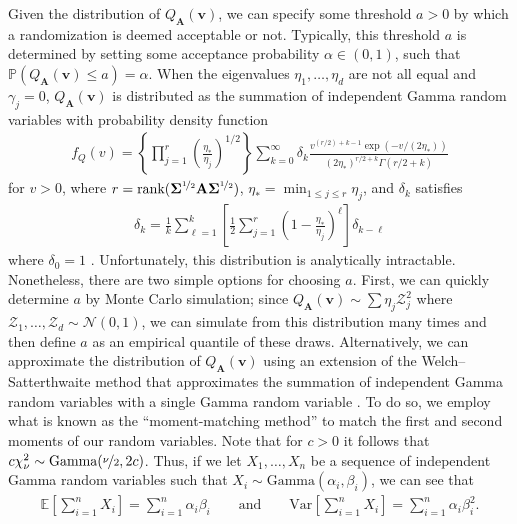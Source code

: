 \documentclass[11pt,twoside]{article}
\theoremstyle{definition}
\theoremstyle{remark}
\begin{document}
Given the distribution of $Q_{\mathbf{A}}(\mathbf{v})$, we can specify some threshold $a > 0$ by which a randomization is deemed acceptable or not. Typically, this threshold $a$ is determined by setting some acceptance probability $\alpha \in (0, 1)$, such that $\mathbb{P}(Q_{\mathbf{A}}(\mathbf{v}) \leq a) = \alpha$. When the eigenvalues $\eta_1, \ldots, \eta_d$ are not all equal and $\gamma_j = 0$, $Q_{\mathbf{A}}(\mathbf{v})$ is distributed as the summation of independent Gamma random variables with probability density function 
\begin{align*}
    f_Q(v) = \left\{\prod^r_{j=1} \left(\frac{\eta_{*}}{ \eta_j} \right)^{1/2} \right\} \sum^\infty_{k=0} \delta_k \frac{v^{(r/2)+k-1}\exp(-v/(2\eta_*))}{(2\eta_*)^{r/2+k}\Gamma(r/2+k)}
\end{align*}
for $v > 0$, where $r =\text{rank}(\mathbf{\Sigma}^{\nicefrac{1}{2}}\mathbf{A} \mathbf{\Sigma}^{\nicefrac{1}{2}})$, $\eta_*= \min_{1\leq j\leq r}\eta_j$, and $\delta_k$ satisfies
\begin{align*}
    \delta_{k} = \frac{1}{k} \sum^{k}_{\ell=1} \left[ \frac{1}{2}\sum^r_{j=1}  \left(1 - \frac{\eta_{*}}{\eta_j} \right)^{\ell}\right] \delta_{k - \ell}
\end{align*}
where $\delta_0 = 1$ \citep{moschopoulos1985distribution}. Unfortunately, this distribution is analytically intractable. Nonetheless, there are two simple options for choosing $a$. First, we can quickly determine $a$ by Monte Carlo simulation; since $Q_{\mathbf{A}}(\mathbf{v}) \sim \sum \eta_j \mathcal{Z}^2_j$ where $\mathcal{Z}_1, \ldots, \mathcal{Z}_d \sim \mathcal{N}(0, 1)$, we can simulate from this distribution many times and then define $a$ as an empirical quantile of these draws. Alternatively, we can approximate the distribution of $Q_{\mathbf{A}}(\mathbf{v})$ using an extension of the Welch–Satterthwaite method that approximates the summation of independent Gamma random variables with a single Gamma random variable \citep{stewart2007simple}. To do so, we employ what is known as the ``moment-matching method'' to match the first and second moments of our random variables. Note that for $c > 0$ it follows that $c \chi^2_\nu \sim \text{Gamma}(\nicefrac{\nu}{2}, 2 c)$. Thus, if we let $X_1, \ldots, X_n$ be a sequence of independent Gamma random variables such that $X_i \sim \text{Gamma}(\alpha_i, \beta_i)$, we can see that
\begin{align*}
    \mathbb{E}\left[\sum^n_{i=1} X_i \right] = \sum^n_{i=1} \alpha_i \beta_i \qquad \text{and} \qquad 
    \text{Var}\left[\sum^n_{i=1} X_i \right] = \sum^n_{i=1} \alpha_i \beta^2_i.
\end{align*}
\end{document}
